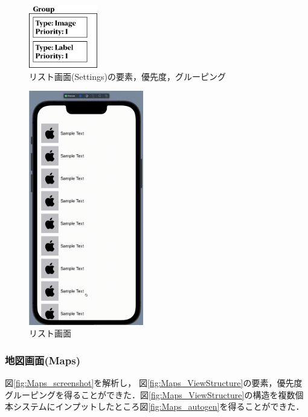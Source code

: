 \begin{figure}[htbp]
  \begin{minipage}{\hsize}
    \begin{center}
       \includegraphics[width=30mm]{img/Settings_ViewStructure.png}
    \end{center}
    \caption{リスト画面(Settings)の要素，優先度，グルーピング}
    \label{fig:Settings_ViewStructure}
  \end{minipage}
\end{figure}

\begin{figure}[htbp]
  \begin{minipage}{\hsize}
    \begin{center}
       \includegraphics[width=50mm]{img/Settings_autogen.png}
    \end{center}
    \caption{リスト画面}
    \label{fig:Settings_autogen}
  \end{minipage}
\end{figure}


\subsubsection{地図画面(Maps)}
図\ref{fig:Maps_screenshot}を解析し， 図\ref{fig:Maps_ViewStructure}の要素，優先度グルーピングを得ることができた．図\ref{fig:Maps_ViewStructure}の構造を複数個本システムにインプットしたところ図\ref{fig:Maps_autogen}を得ることができた．


